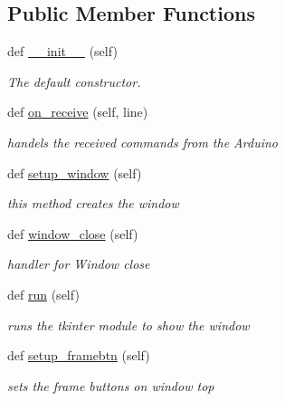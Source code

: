 \subsection*{Public Member Functions}
\begin{DoxyCompactItemize}
\item 
def \mbox{\hyperlink{class_python___client_1_1_window_function_a01d8492097a4aec1382b7d5611e539dd}{\+\_\+\+\_\+init\+\_\+\+\_\+}} (self)
\begin{DoxyCompactList}\small\item\em The default constructor. \end{DoxyCompactList}\item 
def \mbox{\hyperlink{class_python___client_1_1_window_function_aec21cc89e2085eb8d8adabf018ccd0eb}{on\+\_\+receive}} (self, line)
\begin{DoxyCompactList}\small\item\em handels the received commands from the Arduino \end{DoxyCompactList}\item 
def \mbox{\hyperlink{class_python___client_1_1_window_function_a668170ed5685df325812a3293eea68a9}{setup\+\_\+window}} (self)
\begin{DoxyCompactList}\small\item\em this method creates the window \end{DoxyCompactList}\item 
def \mbox{\hyperlink{class_python___client_1_1_window_function_a468af5948b986f639f15ae2f5a490afb}{window\+\_\+close}} (self)
\begin{DoxyCompactList}\small\item\em handler for Window close \end{DoxyCompactList}\item 
\mbox{\label{class_python___client_1_1_window_function_a0ba0640860866ac24b0972c5e40dbe8a}} 
def \mbox{\hyperlink{class_python___client_1_1_window_function_a0ba0640860866ac24b0972c5e40dbe8a}{run}} (self)
\begin{DoxyCompactList}\small\item\em runs the tkinter module to show the window \end{DoxyCompactList}\item 
def \mbox{\hyperlink{class_python___client_1_1_window_function_a0059612952a6abcd18c39d5c1ea6cb9b}{setup\+\_\+framebtn}} (self)
\begin{DoxyCompactList}\small\item\em sets the frame buttons on window top \end{DoxyCompactList}\item 

\end{DoxyCompactItemize}
